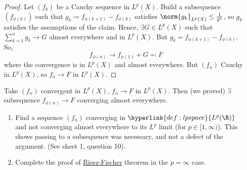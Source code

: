 \documentclass[twoside]{article}
\begin{document}
\begin{proof}
    Let $(f_k)$ be a Cauchy sequence in $L^p(X)$.
    Build a subsequence $(f_{\phi(k)})$ such that $g_k \coloneqq f_{\phi(k+1)} - f_{\phi(k)}$ satisfies $\norm{g_k}_{L^p(X)} \leq \frac{1}{2^k}$, so $g_k$ satisfies the assumptions of the claim.
    Hence, $\exists G \in L^p(X)$ such that $\sum_{k=1}^n g_k \to G$ almost everywhere and in $L^p(X)$. But $g_k = f_{\phi(k+1)} - f_{\phi(k)}$.
    So,
    \begin{equation*}
        f_{\phi(n)} \longrightarrow f_{\phi(1)} + G \eqqcolon F
    \end{equation*}
    where the convergence is in $L^p(X)$ and almost everywhere.
    But $(f_n)$ Cauchy in $L^p(X)$, so $f_n \to F$ in $L^p(X)$.
\end{proof}

\begin{remark}
    Take $(f_n)$ convergent in $L^p(X)$, $f_n \to F$ in $L^p(X)$. Then (we proved) $\exists$ subsequence $f_{\phi(n)} \to F$ converging almost everywhere.
\end{remark}
\begin{ex}
    \leavevmode
    \begin{enumerate}[label=\arabic*)]
        \item Find a sequence $(f_n)$ converging in $\hyperlink{def:lpspace}{L^p(\R)}$ and not converging almost everywhere to its $L^p$ limit (for $p \in [1, \infty)$).
            This shows passing to a subsequence was necessary, and not a defect of the argument.
            (See sheet 1, question 10).
        \item Complete the proof of \hyperlink{thm:rieszFischer}{Riesz-Fischer} theorem in the $p=\infty$ case.
    \end{enumerate}
\end{ex}
\end{document}
